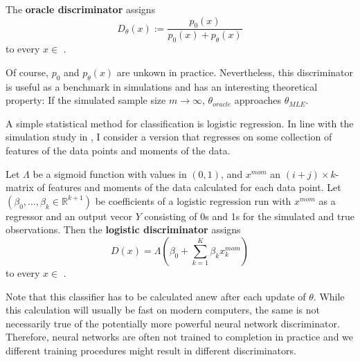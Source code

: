 \begin{definition}
    The \textbf{oracle discriminator} assigns
    \begin{equation}
        D_\theta(x):=\frac{p_0(x)}{p_0(x)+p_\theta(x)} %
    \end{equation}
    to every $x \in$ . %
\end{definition}

Of course, $p_0$ and $p_\theta(x)$ are unkown in practice.
Nevertheless, this discriminator is useful as a benchmark in simulations and has an interesting theoretical property:
If the simulated sample size $m \rightarrow \infty$, $\theta_{oracle}$ approaches $\theta_{MLE}$. %

A simple statistical method for classification is logistic regression.
In line with the simulation study in \textcite{kaji2023adversarial}, I consider a version that regresses on some collection of features of the data points and moments of the data.

\begin{definition}
    Let $\Lambda$ be a sigmoid function with values in $(0,1)$, and $x^{mom}$ an $(i+j)\times k$-matrix of features and moments of the data calculated for each data point.
    Let $(\beta_0, \dots,\beta_k \in \mathbb{R}^{k+1})$ be coefficients of a logistic regression run with $x^{mom}$ as a regressor and an output vecor $Y$ consisting of 0s and 1s for the simulated and true observations. %
    Then the \textbf{logistic discriminator} assigns
    \begin{equation}
        D(x) = \Lambda(\beta_{0} + \sum_{k=1}^{K}\beta_{k} x_{k}^{mom}) %
    \end{equation}
    to every $x \in$ . %
\end{definition}

Note that this classifier has to be calculated anew after each update of $\theta$.
While this calculation will usually be fast on modern computers, the same is not necessarily true of the potentially more powerful neural network discriminator.
Therefore, neural networks are often not trained to completion in practice and we different training procedures might result in different discriminators.

